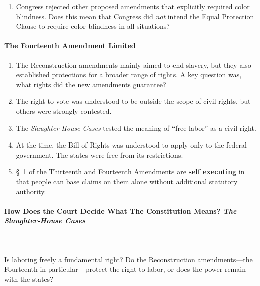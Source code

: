 \begin{enumerate}
\begin{enumerate}
        earlier act. Many of these concerns were justified, as proponents 
        made comments that the amendment's language \emph{should} be construed 
        broadly to end racial discrimination in all forms.\footnote{Casebook 
        pp. 308--09.}
        \item \S\ explicitly overrules \emph{Dred Scott} by establishing 
        birthright citizenship for all people, blacks included.
    \end{enumerate}
    \item Congress rejected other proposed amendments that explicitly required 
    color blindness. Does this mean that Congress did \emph{not} intend the 
    Equal Protection Clause to require color blindness in all situations?
\end{enumerate}

\paragraph{The Fourteenth Amendment Limited}

\begin{enumerate}
    \item The Reconstruction amendments mainly aimed to end slavery, but they 
    also established protections for a broader range of rights. A key question 
    was, what rights did the new amendments guarantee?
    \item The right to vote was understood to be outside the scope of civil 
    rights, but others were strongly contested.
    \item The \emph{Slaughter-House Cases} tested the meaning of ``free labor'' 
    as a civil right.
    \item At the time, the Bill of Rights was understood to apply only to the 
    federal government. The states were free from its restrictions.
    \item \S\ 1 of the Thirteenth and Fourteenth Amendments are \textbf{self 
    executing} in that people can base claims on them alone without 
    additional statutory authority.
\end{enumerate}

\paragraph{How Does the Court Decide What The Constitution Means? \emph{The 
Slaughter-House Cases}}
~\\\\
Is laboring freely a fundamental right? Do the Reconstruction amendments---the 
Fourteenth in particular---protect the right to labor, or does the power 
remain with the states?

